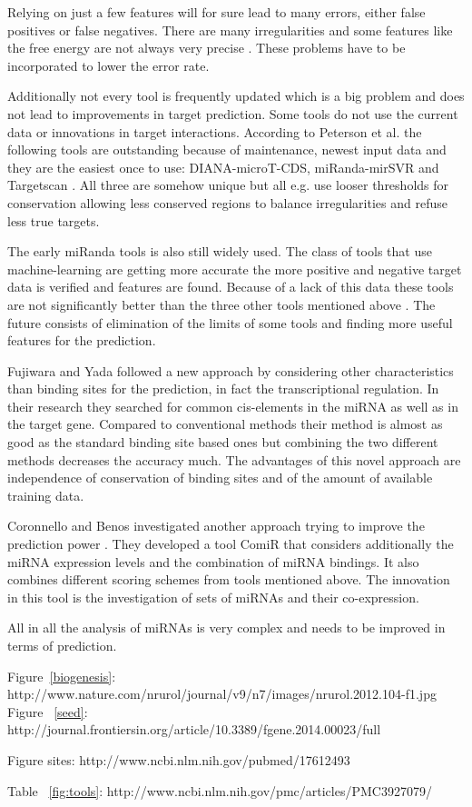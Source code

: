 \documentclass[12pt]{article}
\begin{document}
Relying on just a few features will for sure lead to many errors, either false positives or false negatives. There are many irregularities and some features like the free energy are not always very precise \cite{Peterson}. These problems have to be incorporated to lower the error rate.

Additionally not every tool is frequently updated which is a big problem and does not lead to improvements in target prediction. Some tools do not use the current data or innovations in target interactions. According to Peterson et al. the following tools are outstanding because of maintenance, newest input data and they are the easiest once to use: DIANA-microT-CDS, miRanda-mirSVR and Targetscan \cite{Peterson}. All three are somehow unique but all e.g. use looser thresholds for conservation allowing less conserved regions to balance irregularities and refuse less true targets.

The early miRanda tools is also still widely used. The class of tools that use machine-learning are getting more accurate the more positive and negative target data is verified and features are found. Because of a lack of this data these tools are not significantly better than the three other tools mentioned above \cite{Peterson}.
The future consists of elimination of the limits of some tools and finding more useful features for the prediction.

Fujiwara and Yada \cite{Fuji} followed a new approach by considering other characteristics than binding sites for the prediction, in fact the transcriptional regulation. In their research they searched for common cis-elements in the miRNA as well as in the target gene. Compared to conventional methods their method is almost as good as the standard binding site based ones but combining the two different methods decreases the accuracy much. The advantages of this novel approach are independence of conservation of binding sites and of the amount of available training data. 

Coronnello and Benos investigated another approach trying to improve the prediction power \cite{Coronnello}. They developed a tool ComiR that considers additionally the miRNA expression levels and the combination of miRNA bindings. It also combines different scoring schemes from tools mentioned above. The innovation in this tool is the investigation of sets of miRNAs and their co-expression. 

All in all the analysis of miRNAs is very complex and needs to be improved in terms of prediction.


\newpage



\listoffigures


\listoftables


Figure~\ref{biogenesis}: \cite{Kelly} http://www.nature.com/nrurol/journal/v9/n7/images/nrurol.2012.104-f1.jpg
Figure ~\ref{seed}: http://journal.frontiersin.org/article/10.3389/fgene.2014.00023/full

Figure sites: http://www.ncbi.nlm.nih.gov/pubmed/17612493

Table ~\ref{fig:tools}: http://www.ncbi.nlm.nih.gov/pmc/articles/PMC3927079/
\end{document}
